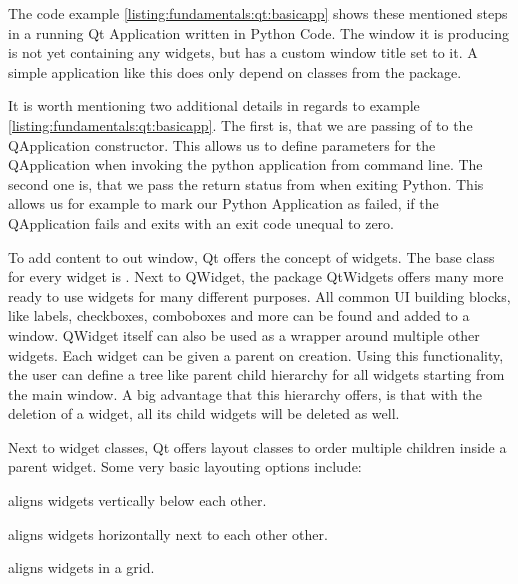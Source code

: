 The code example \ref{listing:fundamentals:qt:basicapp} shows these mentioned
steps in a running Qt Application written in Python Code. The window it is
producing is not yet containing any widgets, but has a custom window title set
to it. A simple application like this does only depend on classes from the
 package.



It is worth mentioning two additional details in regards to example
\ref{listing:fundamentals:qt:basicapp}. The first is, that we are passing of
 to the QApplication constructor. This allows us to
define parameters for the QApplication when invoking the python application from
command line. The second one is, that we pass the return status from
 when exiting Python. This allows us for example
to mark our Python Application as failed, if the QApplication fails and exits
with an exit code unequal to zero.

To add content to out window, Qt offers the concept of widgets. The base class
for every widget is . Next to QWidget, the
package QtWidgets offers many more ready to use widgets for many different
purposes. All common UI building blocks, like labels, checkboxes, comboboxes and
more can be found and added to a window. QWidget itself can also be used as a
wrapper around multiple other widgets. Each widget can be given a parent on
creation. Using this functionality, the user can define a tree like parent child
hierarchy for all widgets starting from the main window. A big advantage that
this hierarchy offers, is that with the deletion of a widget, all its child
widgets will be deleted as well.

Next to widget classes, Qt offers layout classes to order multiple children
inside a parent widget. Some very basic layouting options include:

\begin{description}

    \item {} aligns widgets vertically
        below each other.
    
    \item {} aligns widgets horizontally
        next to each other other.
    
    \item {} aligns widgets in a grid.

\end{description}

